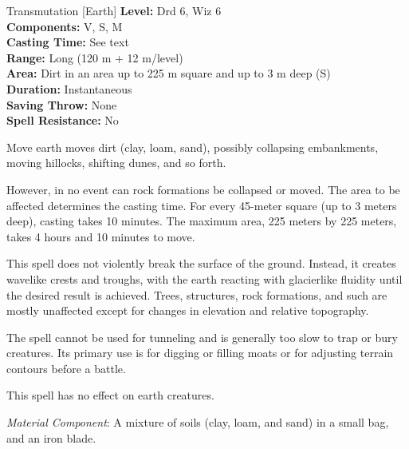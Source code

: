 {Transmutation [Earth]}
{
	\textbf{Level:}
	Drd 6, Wiz 6\\
	\textbf{Components:}
	V, S, M\\
	\textbf{Casting Time:}
	See text\\
	\textbf{Range:}
	Long (120 m + 12 m/level)\\
	\textbf{Area:}
	Dirt in an area up to 225 m square and up to 3 m deep (S)\\
	\textbf{Duration:}
	Instantaneous\\
	\textbf{Saving Throw:}
	None\\
	\textbf{Spell Resistance:}
	No\\
}
{
	Move earth moves dirt (clay, loam, sand), possibly collapsing embankments, moving hillocks, shifting dunes, and so forth.

	However, in no event can rock formations be collapsed or moved. The area to be affected determines the casting time. For every 45-meter square (up to 3 meters deep), casting takes 10 minutes. The maximum area, 225 meters by 225 meters, takes 4 hours and 10 minutes to move.

	This spell does not violently break the surface of the ground. Instead, it creates wavelike crests and troughs, with the earth reacting with glacierlike fluidity until the desired result is achieved. Trees, structures, rock formations, and such are mostly unaffected except for changes in elevation and relative topography.

	The spell cannot be used for tunneling and is generally too slow to trap or bury creatures. Its primary use is for digging or filling moats or for adjusting terrain contours before a battle.

	This spell has no effect on earth creatures.

	\textit{Material Component}:
	A mixture of soils (clay, loam, and sand) in a small bag, and an iron blade.

}
